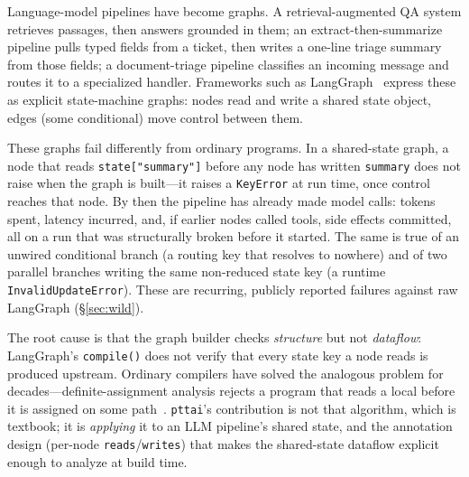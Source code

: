 \documentclass[11pt]{article}
\newcommand{\code}[1]{\texttt{#1}}
\begin{document}
Language-model pipelines have become graphs. A retrieval-augmented QA system
retrieves passages, then answers grounded in them; an extract-then-summarize
pipeline pulls typed fields from a ticket, then writes a one-line triage summary
from those fields; a document-triage pipeline classifies an incoming message and
routes it to a specialized handler. Frameworks such as
LangGraph~\citep{langgraph} express these as explicit state-machine graphs:
nodes read and write a shared state object, edges (some conditional) move control
between them.

These graphs fail differently from ordinary programs. In a shared-state graph,
a node that reads \code{state["summary"]} before any node has written
\code{summary} does not raise when the graph is built---it raises a
\code{KeyError} at run time, once control reaches that node. By then the pipeline
has already made model calls: tokens spent, latency incurred, and, if earlier
nodes called tools, side effects committed, all on a run that was structurally
broken before it started. The same is true of an unwired conditional branch (a
routing key that resolves to nowhere) and of two parallel branches writing the
same non-reduced state key (a runtime \code{InvalidUpdateError}). These are
recurring, publicly reported failures against raw LangGraph
(\S\ref{sec:wild}).

The root cause is that the graph builder checks \emph{structure} but not
\emph{dataflow}: LangGraph's \code{compile()} does not verify that every state
key a node reads is produced upstream. Ordinary compilers have solved the
analogous problem for decades---definite-assignment analysis rejects a program
that reads a local before it is assigned on some
path~\citep{jls,kildall,dragon}. \code{pttai}'s contribution is not that
algorithm, which is textbook; it is \emph{applying} it to an LLM pipeline's
shared state, and the annotation design (per-node \code{reads}/\code{writes})
that makes the shared-state dataflow explicit enough to analyze at build time.
\end{document}
